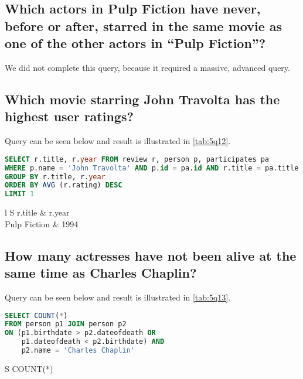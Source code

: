 \subsection{Which actors in Pulp Fiction have never, before or after, starred in the same movie as one of the other actors in “Pulp Fiction”?}
We did not complete this query, because it required a massive, advanced query.

\subsection{Which movie starring John Travolta has the highest user ratings?}
Query can be seen below and result is illustrated in \cref{tab:5q12}.

\begin{lstlisting}[language=SQL]
SELECT r.title, r.year FROM review r, person p, participates pa 
WHERE p.name = 'John Travolta' AND p.id = pa.id AND r.title = pa.title AND r.year = pa.year
GROUP BY r.title, r.year
ORDER BY AVG (r.rating) DESC
LIMIT 1
\end{lstlisting}

\begin{table}
  \centering
  \begin{tabular}[htpb]{l S}
    \toprule
    r.title & {r.year} \\
    \midrule
    Pulp Fiction & 1994 \\
    \bottomrule
  \end{tabular}
  \caption{Results of query 12}\label{tab:5q12}
\end{table}

\subsection{How many actresses have not been alive at the same time as Charles Chaplin?}
Query can be seen below and result is illustrated in \cref{tab:5q13}.

\begin{lstlisting}[language=SQL]
SELECT COUNT(*)
FROM person p1 JOIN person p2
ON (p1.birthdate > p2.dateofdeath OR
    p1.dateofdeath < p2.birthdate) AND
    p2.name = 'Charles Chaplin'
\end{lstlisting}
%
\begin{table}
  \centering
  \begin{tabular}[htpb]{S}
    \toprule
    {COUNT(*)} \\
     \\
    \bottomrule
  \end{tabular}
  \caption{Results of query 13}\label{tab:5q13}
\end{table}

